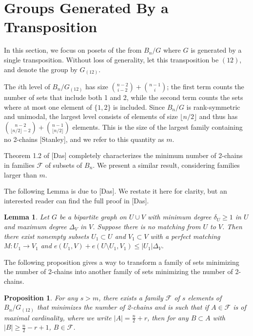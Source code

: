 \documentclass[12pt]{article}
\theoremstyle{plain}
\newtheorem{lemma}[theorem]{Lemma}
\newtheorem{proposition}[theorem]{Proposition}
\theoremstyle{definition}
\theoremstyle{remark}
\newcommand{\F}{\mathcal{F}}
\begin{document}
\section{Groups Generated By a Transposition}

In this section, we focus on posets of the from $B_n/ G$ where $G$ is generated by a single transposition. Without loss of generality, let this transposition be $(12)$, and denote the group by $G_{(12)}$. 

The $i$th level of $B_n / G_{(12)}$ has size $\binom{n-2}{i-2} + \binom{n-1}{i}$; the first term counts the number of sets that include both 1 and 2, while the second term counts the sets where at most one element of $\{1,2\}$ is included. Since $B_n / G$ is rank-symmetric and unimodal, the largest level consists of elements of size $\lfloor n/2 \rfloor$ and thus has $\binom{n-2}{\lfloor n/2 \rfloor -2} + \binom{n-1}{\lfloor n/2 \rfloor}$ elements. This is the size of the largest family containing no 2-chains [Stanley], and we refer to this quantity as $m$.

Theorem 1.2 of [Das] completely characterizes the minimum number of 2-chains in families $\F$ of subsets of $B_n$. We present a similar result, considering families larger than $m$. 

The following Lemma is due to [Das]. We restate it here for clarity, but an interested reader can find the full proof in [Das].

\begin{lemma}
\label{lemma2}
Let $G$ be a bipartite graph on $U \cup V$ with minimum degree $\delta_U \geq 1$ in $U$ and maximum degree $\Delta_V$ in $V$. Suppose there is no matching from $U$ to $V$. Then there exist nonempty subsets $U_1 \subset U$ and $V_1 \subset V$ with a perfect matching $M: U_1 \to V_1$ and $e(U_1,V) + e(U \setminus U_1,V_1) \leq |U_1| \Delta_V$.
\end{lemma}

The following proposition gives a way to transform a family of sets minimizing the number of 2-chains into another family of sets minimizing the number of 2-chains. 

\begin{proposition}
\label{proposition1} For any $s > m$, there exists a family $\F$ of $s$ elements of $B_n / G_{(12)}$ that minimizes the number of 2-chains and is such that if $A \in \F$ is of maximal cardinality, where we write $|A| = \frac{n}{2}+r$, then for any $B \subset A$ with $|B| \geq \frac{n}{2} - r + 1$, $B \in \F$.
\end{proposition}
\end{document}
